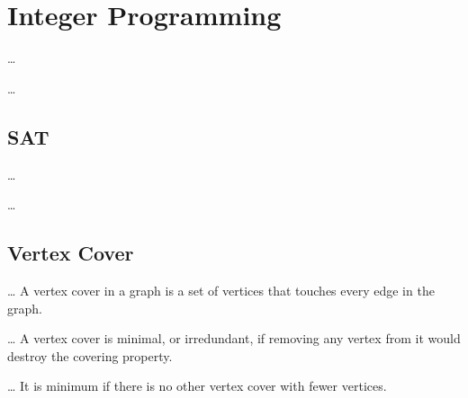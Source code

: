 \chapter{Integer Programming}
\ldots{}


\begin{definition}
  \ldots{}
\end{definition}


\section{SAT}

\begin{definition}[SAT]
  \ldots{}
\end{definition}

\begin{problem}
  \ldots{}
\end{problem}

\section{Vertex Cover}

\begin{definition}
  \ldots{}
  A vertex cover in a graph is a set of vertices that touches every edge in the graph. 
\end{definition}


\begin{definition}
  \ldots{}
  A vertex cover is minimal, or irredundant, if removing any vertex from it would destroy the covering property. 
\end{definition}


\begin{definition}
  \ldots{}
  It is minimum if there is no other vertex cover with fewer vertices. 
\end{definition}


